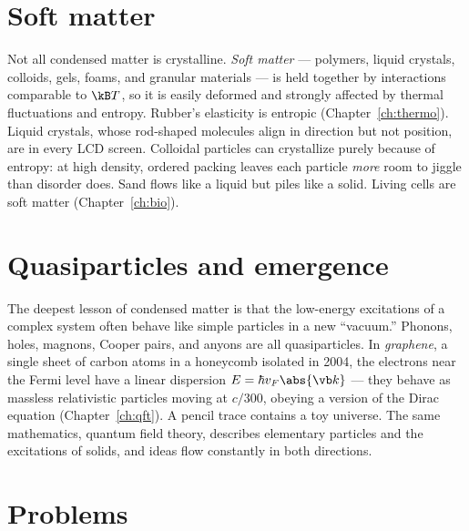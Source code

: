 \section{Soft matter}

Not all condensed matter is crystalline. \emph{Soft matter} --- polymers, liquid crystals, colloids, gels, foams, and granular materials --- is held together by interactions comparable to $\kB T$, so it is easily deformed and strongly affected by thermal fluctuations and entropy. Rubber's elasticity is entropic (Chapter~\ref{ch:thermo}). Liquid crystals, whose rod-shaped molecules align in direction but not position, are in every LCD screen. Colloidal particles can crystallize purely because of entropy: at high density, ordered packing leaves each particle \emph{more} room to jiggle than disorder does. Sand flows like a liquid but piles like a solid. Living cells are soft matter (Chapter~\ref{ch:bio}).

\section{Quasiparticles and emergence}

The deepest lesson of condensed matter is that the low-energy excitations of a complex system often behave like simple particles in a new ``vacuum.'' Phonons, holes, magnons, Cooper pairs, and anyons are all quasiparticles. In \emph{graphene}, a single sheet of carbon atoms in a honeycomb isolated in 2004, the electrons near the Fermi level have a linear dispersion $E = \hbar v_F\abs{\vb k}$ --- they behave as massless relativistic particles moving at $c/300$, obeying a version of the Dirac equation (Chapter~\ref{ch:qft}). A pencil trace contains a toy universe. The same mathematics, quantum field theory, describes elementary particles and the excitations of solids, and ideas flow constantly in both directions.

\section{Problems}

